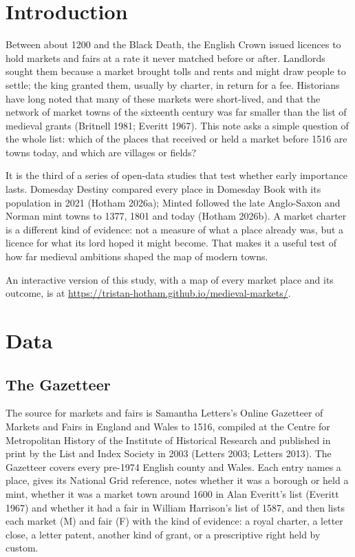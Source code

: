 \documentclass[11pt,a4paper]{article}
\begin{document}
\section{Introduction}

Between about 1200 and the Black Death, the English Crown issued licences to hold markets and fairs at a rate it never matched before or after. Landlords sought them because a market brought tolls and rents and might draw people to settle; the king granted them, usually by charter, in return for a fee. Historians have long noted that many of these markets were short-lived, and that the network of market towns of the sixteenth century was far smaller than the list of medieval grants (Britnell 1981; Everitt 1967). This note asks a simple question of the whole list: which of the places that received or held a market before 1516 are towns today, and which are villages or fields?

It is the third of a series of open-data studies that test whether early importance lasts. Domesday Destiny compared every place in Domesday Book with its population in 2021 (Hotham 2026a); Minted followed the late Anglo-Saxon and Norman mint towns to 1377, 1801 and today (Hotham 2026b). A market charter is a different kind of evidence: not a measure of what a place already was, but a licence for what its lord hoped it might become. That makes it a useful test of how far medieval ambitions shaped the map of modern towns.

An interactive version of this study, with a map of every market place and its outcome, is at \url{https://tristan-hotham.github.io/medieval-markets/}.

\section{Data}

\subsection{The Gazetteer}

The source for markets and fairs is Samantha Letters's Online Gazetteer of Markets and Fairs in England and Wales to 1516, compiled at the Centre for Metropolitan History of the Institute of Historical Research and published in print by the List and Index Society in 2003 (Letters 2003; Letters 2013). The Gazetteer covers every pre-1974 English county and Wales. Each entry names a place, gives its National Grid reference, notes whether it was a borough or held a mint, whether it was a market town around 1600 in Alan Everitt's list (Everitt 1967) and whether it had a fair in William Harrison's list of 1587, and then lists each market (M) and fair (F) with the kind of evidence: a royal charter, a letter close, a letter patent, another kind of grant, or a prescriptive right held by custom.
\end{document}

